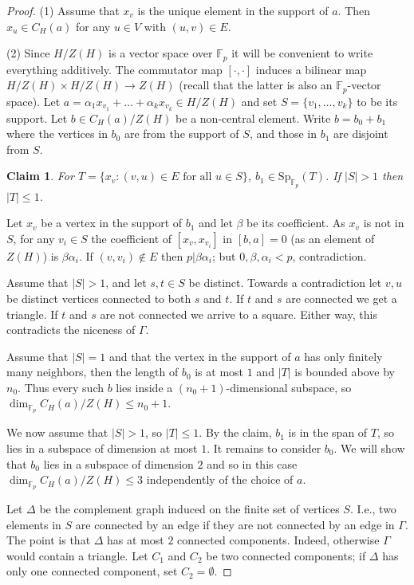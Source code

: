 \documentclass[11pt]{amsart}
\theoremstyle{plain}
\newtheorem*{claim}{Claim}
\theoremstyle{definition}
\theoremstyle{remark}
\numberwithin{equation}{section}
\newenvironment{claimproof}[1][\proofname]
  {%
    \proof[#1]%
      \renewcommand*\qedsymbol{$\square$ (claim)}%
  }
  {%
    \endproof%
  }
\begin{document}
\begin{proof}
    (1) Assume that $x_v$ is the unique element in the support of $a$. Then $x_u\in C_H(a)$ for any $u\in V$ with $(u,v)\in E$.

    (2) Since $H/Z(H)$ is a vector space over $\mathbb{F}_p$ it will be convenient to write everything additively. The commutator map $[\cdot,\cdot]$ induces a bilinear map $H/Z(H)\times H/Z(H)\to Z(H)$ (recall that the latter is also an $\mathbb{F}_p$-vector space). Let $a=\alpha_1 x_{v_1}+\dots + \alpha_k x_{v_k}\in H/Z(H)$ and set $S=\{v_1,\dots, v_k\}$ to be its support. Let $b\in C_H(a)/Z(H)$ be a non-central element. Write $b=b_0+b_1$ where the vertices in $b_0$ are from the support of $S$, and those in $b_1$ are disjoint from $S$. 

    \begin{claim}
        For $T=\{x_v: \text{$(v,u)\in E$ for all $u\in S$}\}$,
        $b_1\in \mathrm{Sp}_{\mathbb{F}_p}(T)$. If $|S|>1$ then $|T|\leq 1$. 
    \end{claim}
    \begin{claimproof}
        Let $x_v$ be a vertex in the support of $b_1$ and let $\beta$ be its coefficient. As $x_v$ is not in $S$, for any $v_i\in S$ the coefficient of $[x_v,x_{v_i}]$ in $[b,a]=0$ (as an element of $Z(H)$) is $\beta\alpha_i$. If $(v,v_i)\notin E$ then $p|\beta\alpha_i$; but $0,\beta,\alpha_i<p$, contradiction.

        Assume that $|S|>1$, and let $s,t\in S$ be distinct. Towards a contradiction let $v,u$ be distinct vertices connected to both $s$ and $t$. If $t$ and $s$ are connected we get a triangle. If $t$ and $s$ are not connected we arrive to a square. Either way, this contradicts the niceness of $\Gamma$.
    \end{claimproof}

    Assume that $|S|=1$ and that the vertex in the support of $a$ has only finitely many neighbors, then the length of $b_0$ is at most $1$ and $|T|$ is bounded above by $n_0$. Thus every such $b$ lies inside a $(n_0+1)$-dimensional subspace, so $\dim_{\mathbb{F}_p} C_H(a)/Z(H)\leq n_0+1$.
    
    We now assume that $|S|>1$, so $|T|\leq 1$. By the claim, $b_1$ is in the span of $T$, so lies in a subspace of dimension at most $1$. It remains to consider $b_0$. We will show that $b_0$ lies in a subspace of dimension $2$ and so in this case $\dim_{\mathbb{F}_p}C_H(a)/Z(H)\leq 3$ independently of the choice of $a$.

     Let $\Delta$ be the complement graph induced on the finite set of vertices $S$. I.e., two elements in $S$ are connected by an edge if they are not connected by an edge in $\Gamma$. The point is that $\Delta$ has at most $2$ connected components. Indeed, otherwise $\Gamma$ would contain a triangle. Let $C_1$ and $C_2$ be two connected components; if $\Delta$ has only one connected component, set $C_2=\emptyset$.


\end{proof}
\end{document}
